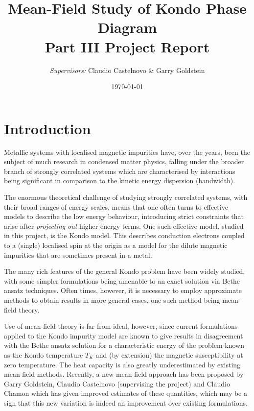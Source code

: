 \documentclass[12pt]{article}
\begin{document}


\title{
  Mean-Field Study of Kondo Phase Diagram \\
  \large Part III Project Report
}
\author{\textit{Supervisors:} Claudio Castelnovo \& Garry Goldstein}
\date{\today}


\maketitle

\begin{abstract}
\end{abstract}

\section{Introduction}

Metallic systems with localised magnetic impurities have, over the years, been the subject of much research in condensed matter physics, falling under the broader branch of strongly correlated systems which are characterised by interactions being significant in comparison to the kinetic energy dispersion (bandwidth).

The enormous theoretical challenge of studying strongly correlated systems, with their broad ranges of energy scales, means that one often turns to effective models to describe the low energy behaviour, introducing strict constraints that arise after \textit{projecting out} higher energy terms. One such effective model, studied in this project, is the Kondo model. This describes conduction electrons coupled to a (single) localised spin at the origin as a model for the dilute magnetic impurities that are sometimes present in a metal.

The many rich features of the general Kondo problem have been widely studied, with some simpler formulations being amenable to an exact solution via Bethe ansatz techniques. Often times, however, it is necessary to employ approximate methods to obtain results in more general cases, one such method being mean-field theory.

Use of mean-field theory is far from ideal, however, since current formulations applied to the Kondo impurity model are known to give results in disagreement with the Bethe ansatz solution for a characteristic energy of the problem known as the Kondo temperature $ T_{K} $ and (by extension) the magnetic susceptibility at zero temperature. The heat capacity is also greatly underestimated by existing mean-field methods. Recently, a new mean-field approach has been proposed by Garry Goldstein, Claudio Castelnovo (supervising the project) and Claudio Chamon which has given improved estimates of these quantities, which may be a sign that this new variation is indeed an improvement over existing formulations.
\end{document}
